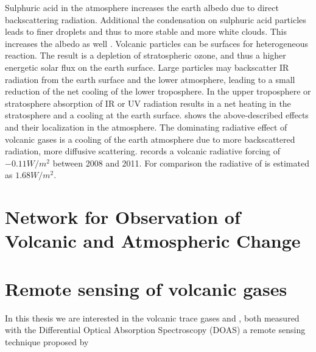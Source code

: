 \documentclass  [
  paper    = a4,
  BCOR     = 10mm,
  twoside,
  fontsize = 12pt,
  fleqn,
  toc      = bibnumbered,
  toc      = listofnumbered,
  numbers  = noendperiod,
  headings = normal,
  listof   = leveldown,
  version  = 3.03
]                                       {scrreprt}
\begin{document}
Sulphuric acid in the atmosphere increases the earth albedo due to direct backscattering radiation. Additional the condensation on sulphuric acid particles leads to finer droplets and thus to more stable and more white clouds. This increases the albedo as well \citep{twomey1974pollution}.
Volcanic particles can be surfaces for heterogeneous reaction. The result is a depletion of stratospheric ozone, and thus a higher energetic solar flux on the earth surface.
Large particles may backscatter IR radiation from the earth surface and the lower atmosphere, leading to a small reduction of the net cooling of the lower troposphere.
In the upper troposphere or stratosphere absorption of IR or UV radiation results in a net heating in the stratosphere and a cooling at the earth surface.
 shows the above-described effects and their localization in the atmosphere.
The dominating radiative effect of volcanic gases is a cooling of the earth atmosphere due to more backscattered radiation, more diffusive scattering\citep{robock2000volcanic}.
\citet{IPCC} records a volcanic radiative forcing of $-0.11W/m^{2}$ between 2008 and 2011. For comparison the radiative of   is estimated as  $1.68W/m^{2}$.

\chapter{Network for Observation of Volcanic and Atmospheric Change \label{NOVAC}}
%    

%
\chapter{Remote sensing of volcanic gases}

In this thesis we are interested in the volcanic trace gases  and , both measured with the Differential Optical Absorption Spectroscopy (DOAS) a remote sensing technique proposed by \citet{platt1980observations}
\end{document}
